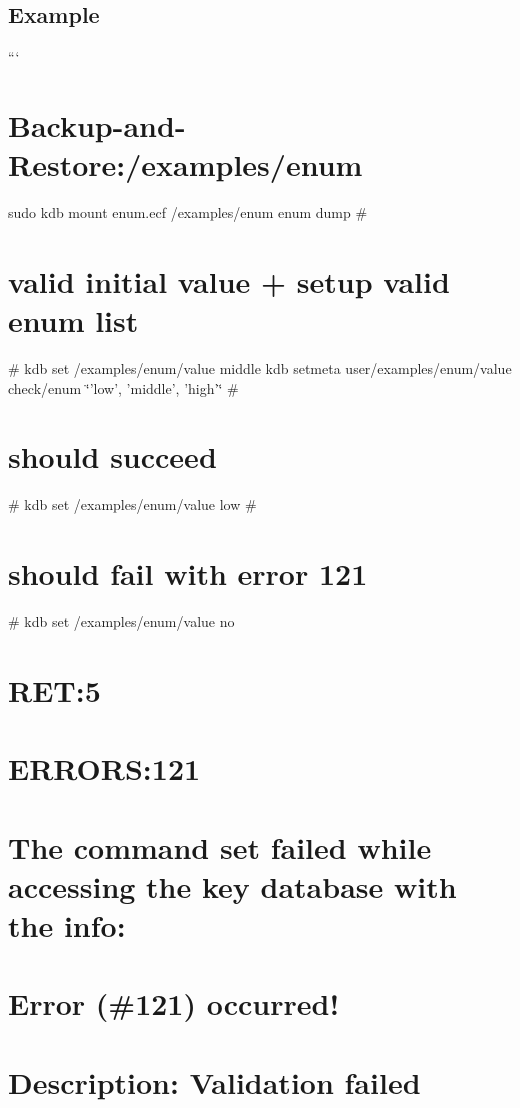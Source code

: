 \subsection*{Example}

``` \section*{Backup-\/and-\/\+Restore\+:/examples/enum}

sudo kdb mount enum.\+ecf /examples/enum enum dump \# \section*{valid initial value + setup valid enum list}

\# kdb set /examples/enum/value middle kdb setmeta user/examples/enum/value check/enum \char`\"{}'low', 'middle', 'high'\char`\"{} \# \section*{should succeed}

\# kdb set /examples/enum/value low \# \section*{should fail with error 121}

\# kdb set /examples/enum/value no \section*{R\+E\+T\+:5}

\section*{E\+R\+R\+O\+R\+S\+:121}

\section*{The command set failed while accessing the key database with the info\+:}

\section*{Error (\#121) occurred!}

\section*{Description\+: Validation failed}

